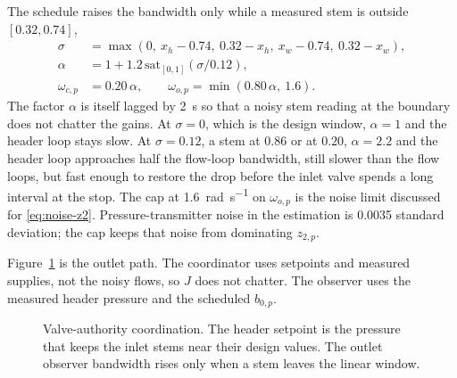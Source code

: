 The schedule raises the bandwidth only while a measured stem is outside $[0.32,0.74]$,
\begin{equation}
\label{eq:schedule}
\begin{aligned}
\sigma &= \max(0,\ x_h-0.74,\ 0.32-x_h,\ x_w-0.74,\ 0.32-x_w),\\
\alpha &= 1 + 1.2\,\mathrm{sat}_{[0,1]}(\sigma/0.12),\\
\omega_{c,p} &= 0.20\,\alpha, \qquad \omega_{o,p} = \min(0.80\,\alpha,\ 1.6).
\end{aligned}
\end{equation}
The factor $\alpha$ is itself lagged by \SI{2}{s} so that a noisy stem reading at the boundary does not chatter the gains. At $\sigma=0$, which is the design window, $\alpha=1$ and the header loop stays slow. At $\sigma=0.12$, a stem at $0.86$ or at $0.20$, $\alpha=2.2$ and the header loop approaches half the flow-loop bandwidth, still slower than the flow loops, but fast enough to restore the drop before the inlet valve spends a long interval at the stop. The cap at \SI{1.6}{\radian\per\second} on $\omega_{o,p}$ is the noise limit discussed for \eqref{eq:noise-z2}. Pressure-transmitter noise in the estimation is \SI{0.0035}{\barg} standard deviation; the cap keeps that noise from dominating $z_{2,p}$.

Figure~\ref{fig:authority} is the outlet path. The coordinator uses setpoints and measured supplies, not the noisy flows, so $J$ does not chatter. The observer uses the measured header pressure and the scheduled $b_{0,p}$.

\begin{figure}[htbp]
\centering
{}
\caption{Valve-authority coordination. The header setpoint is the pressure that keeps the inlet stems near their design values. The outlet observer bandwidth rises only when a stem leaves the linear window.}
\label{fig:authority}
\end{figure}

